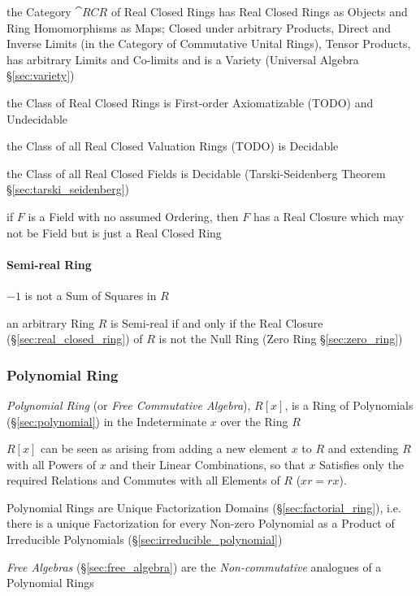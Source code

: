 the Category $\cat{RCR}$ of Real Closed Rings has Real Closed Rings as Objects
and Ring Homomorphisms as Maps; Closed under arbitrary Products, Direct and
Inverse Limits (in the Category of Commutative Unital Rings), Tensor Products,
has arbitrary Limits and Co-limits and is a Variety (Universal Algebra
\S\ref{sec:variety})

the Class of Real Closed Rings is First-order Axiomatizable (TODO) and
Undecidable

the Class of all Real Closed Valuation Rings (TODO) is Decidable

the Class of all Real Closed Fields is Decidable (\fist Tarski-Seidenberg
Theorem \S\ref{sec:tarski_seidenberg})

if $F$ is a Field with no assumed Ordering, then $F$ has a Real Closure which
may not be Field but is just a Real Closed Ring



\paragraph{Semi-real Ring}\label{sec:semireal_ring}\hfill

$-1$ is not a Sum of Squares in $R$

an arbitrary Ring $R$ is Semi-real if and only if the Real Closure
(\S\ref{sec:real_closed_ring}) of $R$ is not the Null Ring (Zero Ring
\S\ref{sec:zero_ring})



\subsubsection{Polynomial Ring}\label{sec:polynomial_ring}

\emph{Polynomial Ring} (or \emph{Free Commutative Algebra}), $R[x]$, is a Ring
of Polynomials (\S\ref{sec:polynomial}) in the Indeterminate $x$ over the Ring
$R$

$R[x]$ can be seen as arising from adding a new element $x$ to $R$ and
extending $R$ with all Powers of $x$ and their Linear Combinations, so that $x$
Satisfies only the required Relations and Commutes with all Elements of $R$ ($xr
= rx$).

Polynomial Rings are Unique Factorization Domains (\S\ref{sec:factorial_ring}),
i.e. there is a unique Factorization for every Non-zero Polynomial as a Product
of Irreducible Polynomials (\S\ref{sec:irreducible_polynomial})

\fist \emph{Free Algebras} (\S\ref{sec:free_algebra}) are the
\emph{Non-commutative} analogues of a Polynomial Rings

